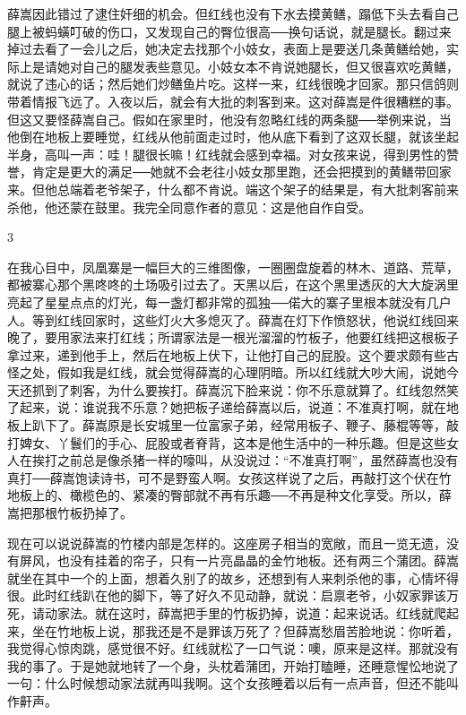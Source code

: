 薛嵩因此错过了逮住奸细的机会。但红线也没有下水去摸黄鳝，蹋低下头去看自己腿上被蚂蟥叮破的伤口，又发现自己的臀位很高──换句话说，就是腿长。翻过来掉过去看了一会儿之后，她决定去找那个小妓女，表面上是要送几条黄鳝给她，实际上是请她对自己的腿发表些意见。小妓女本不肯说她腿长，但又很喜欢吃黄鳝，就说了违心的话；然后她们炒鳝鱼片吃。这样一来，红线很晚才回家。那只信鸽则带着情报飞远了。入夜以后，就会有大批的刺客到来。这对薛嵩是件很糟糕的事。但这又要怪薛嵩自己。假如在家里时，他没有忽略红线的两条腿──举例来说，当他倒在地板上要睡觉，红线从他前面走过时，他从底下看到了这双长腿，就该坐起半身，高叫一声：哇！腿很长嘛！红线就会感到幸福。对女孩来说，得到男性的赞誉，肯定是更大的满足──她就不会老往小妓女那里跑，还会把摸到的黄鳝带回家来。但他总端着老爷架子，什么都不肯说。端这个架子的结果是，有大批刺客前来杀他，他还蒙在鼓里。我完全同意作者的意见：这是他自作自受。 

3 

在我心目中，凤凰寨是一幅巨大的三维图像，一圈圈盘旋着的林木、道路、荒草，都被寨心那个黑咚咚的土场吸引过去了。天黑以后，在这个黑里透灰的大大旋涡里亮起了星星点点的灯光，每一盏灯都非常的孤独──偌大的寨子里根本就没有几户人。等到红线回家时，这些灯火大多熄灭了。薛嵩在灯下作愤怒状，他说红线回来晚了，要用家法来打红线；所谓家法是一根光溜溜的竹板子，他要红线把这根板子拿过来，递到他手上，然后在地板上伏下，让他打自己的屁股。这个要求颇有些古怪之处，假如我是红线，就会觉得薛嵩的心理阴暗。所以红线就大吵大闹，说她今天还抓到了刺客，为什么要挨打。薛嵩沉下脸来说：你不乐意就算了。红线忽然笑了起来，说：谁说我不乐意？她把板子递给薛嵩以后，说道：不准真打啊，就在地板上趴下了。薛嵩原是长安城里一位富家子弟，经常用板子、鞭子、藤棍等等，敲打婢女、丫鬟们的手心、屁股或者脊背，这本是他生活中的一种乐趣。但是这些女人在挨打之前总是像杀猪一样的嚎叫，从没说过：“不准真打啊”，虽然薛嵩也没有真打──薛嵩饱读诗书，可不是野蛮人啊。女孩这样说了之后，再敲打这个伏在竹地板上的、橄榄色的、紧凑的臀部就不再有乐趣──不再是种文化享受。所以，薛嵩把那根竹板扔掉了。 

现在可以说说薛嵩的竹楼内部是怎样的。这座房子相当的宽敞，而且一览无遗，没有屏风，也没有挂着的帘子，只有一片亮晶晶的金竹地板。还有两三个蒲团。薛嵩就坐在其中一个的上面，想着久别了的故乡，还想到有人来刺杀他的事，心情坏得很。此时红线趴在他的脚下，等了好久不见动静，就说：启禀老爷，小奴家罪该万死，请动家法。就在这时，薛嵩把手里的竹板扔掉，说道：起来说话。红线就爬起来，坐在竹地板上说，那我还是不是罪该万死了？但薛嵩愁眉苦脸地说：你听着，我觉得心惊肉跳，感觉很不好。红线就松了一口气说：噢，原来是这样。那就没有我的事了。于是她就地转了一个身，头枕着蒲团，开始打瞌睡，还睡意惺忪地说了一句：什么时候想动家法就再叫我啊。这个女孩睡着以后有一点声音，但还不能叫作鼾声。 

